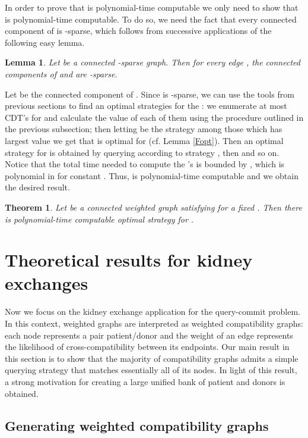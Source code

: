 \documentclass[12pt]{article}
\newtheorem{lemma}{Lemma}
\newtheorem{theo}{Theorem}
\begin{document}
	In order to prove that  is polynomial-time computable we only need to show that  is polynomial-time computable. To do so, we need the fact that every connected component of  is -sparse, which follows from successive applications of the following easy lemma.
	
	\begin{lemma} \label{delSparse}
		Let  be a connected -sparse graph. Then for every edge , the connected components of  and  are -sparse.
	\end{lemma}

	Let  be the connected component of . Since  is -sparse, we can use the tools from previous sections to find an optimal strategies  for the : we enumerate at most  CDT's for  and calculate the value of each of them using the procedure outlined in the previous subsection; then letting  be the strategy among those which has largest value we get that  is optimal for  (cf. Lemma \ref{Fopt}). Then an optimal strategy  for  is obtained by querying according to strategy , then  and so on. Notice that the total time needed to compute the 's is bounded by , which is polynomial in  for constant . Thus,  is polynomial-time computable and we obtain the desired result. 
	
		\begin{theo}		
			Let  be a connected weighted graph satisfying  for a fixed . Then there is polynomial-time computable optimal strategy for .
		\end{theo}


	\section{Theoretical results for kidney exchanges} \label{theoKidney}

		Now we focus on the kidney exchange application for the query-commit problem. In this context, weighted graphs are interpreted as weighted compatibility graphs: each node represents a pair patient/donor and the weight of an edge represents the likelihood of cross-compatibility between its endpoints. Our main result in this section is to show that the majority of compatibility graphs admits a simple querying strategy that matches essentially all of its nodes. In light of this result, a strong motivation for creating a large unified bank of patient and donors is obtained.
		
		\subsection{Generating weighted compatibility graphs} \label{kidneyModel}
		
\end{document}
